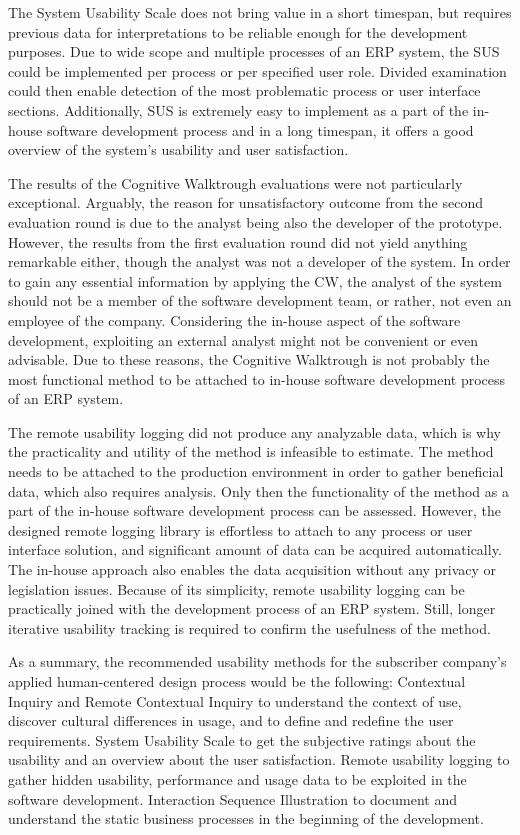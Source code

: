 \documentclass[12pt,a4paper,oneside,pdftex]{report}
\begin{document}
The System Usability Scale does not bring value in a short timespan, but requires previous data for interpretations to be reliable enough for the development purposes. Due to wide scope and multiple processes of an ERP system, the SUS could be implemented per process or per specified user role. Divided examination could then enable detection of the most problematic process or user interface sections. Additionally, SUS is extremely easy to implement as a part of the in-house software development process and in a long timespan, it offers a good overview of the system's usability and user satisfaction. 

The results of the Cognitive Walktrough evaluations were not particularly exceptional. Arguably, the reason for unsatisfactory outcome from the second evaluation round is due to the analyst being also the developer of the prototype. However, the results from the first evaluation round did not yield anything remarkable either, though the analyst was not a developer of the system. In order to gain any essential information by applying the CW, the analyst of the system should not be a member of the software development team, or rather, not even an employee of the company. Considering the in-house aspect of the software development, exploiting an external analyst might not be convenient or even advisable. Due to these reasons, the Cognitive Walktrough is not probably the most functional method to be attached to in-house software development process of an ERP system. 

The remote usability logging did not produce any analyzable data, which is why the practicality and utility of the method is infeasible to estimate. The method needs to be attached to the production environment in order to gather beneficial data, which also requires analysis. Only then the functionality of the method as a part of the in-house software development process can  be assessed. However, the designed remote logging library is effortless to attach to any process or user interface solution, and significant amount of data can be acquired automatically. The in-house approach also enables the data acquisition without any privacy or legislation issues. Because of its simplicity, remote usability logging can be practically joined with the development process of an  ERP system. Still, longer iterative usability tracking is required to confirm the usefulness of the method.

As a summary, the recommended usability methods for the subscriber company's applied human-centered design process would be the following: Contextual Inquiry and Remote Contextual Inquiry to understand the context of use, discover cultural differences in usage, and to define and redefine the user requirements. System Usability Scale to get the subjective ratings about the usability and an overview about the user satisfaction. Remote usability logging to gather hidden usability, performance and usage data to be exploited in the software development. Interaction Sequence Illustration to document and understand the static business processes in the beginning of the development.
 
\end{document}
